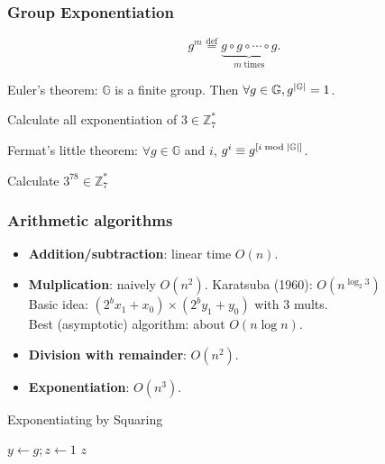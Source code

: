 \begin{frame}\frametitle{Group Exponentiation}
\[ g^m \overset{\text{def}}{=} \underbrace{g\circ g\circ \cdots \circ g}_{m\; \text{times}}. \]
\begin{theorem}
Euler's theorem: $\mathbb{G}$ is a finite group. Then $\forall g \in \mathbb{G}, g^{\lvert\mathbb{G}\rvert}=1$.
\end{theorem}
\begin{exampleblock}{Calculate all exponentiation of $3 \in \mathbb{Z}_{7}^*$}
\end{exampleblock}
\begin{corollary}
Fermat's little theorem: $\forall g \in \mathbb{G}$ and $i$, $g^i \equiv g^{[i \bmod {\lvert\mathbb{G}\rvert}]}$.
\end{corollary}
\begin{exampleblock}{Calculate $3^{78} \in \mathbb{Z}_{7}^*$}
\end{exampleblock}
\end{frame}
\begin{frame}\frametitle{Arithmetic algorithms}
\begin{itemize}
\item \textbf{Addition/subtraction}: linear time $O(n)$.
\item \textbf{Mulplication}: naively $O(n^2)$. Karatsuba (1960): $O(n^{\log_2 3})$\\
Basic idea: $(2^bx_1+x_0) \times (2^by_1+ y_0)$ with 3 mults.\\
Best (asymptotic) algorithm: about $O(n\log n)$.
\item \textbf{Division with remainder}: $O(n^2)$.
\item \textbf{Exponentiation}: $O(n^3)$.
\end{itemize}
\begin{algorithm}[H]
\DontPrintSemicolon
\caption{Exponentiating by Squaring}
\BlankLine
$y \gets g; z \gets 1$\;
\Return $z$
\end{algorithm}
\end{frame}
